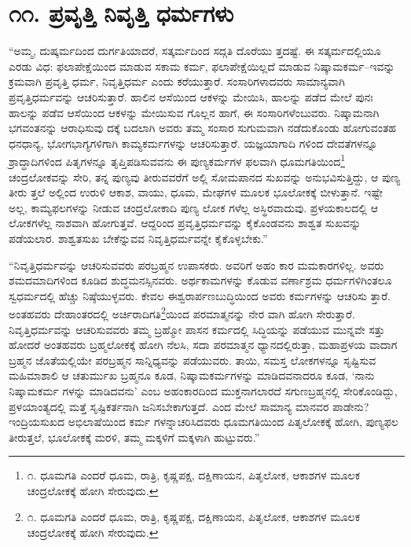 
\chapter{೧೧. ಪ್ರವೃತ್ತಿ ನಿವೃತ್ತಿ ಧರ್ಮಗಳು}

“ಅಮ್ಮ, ದುಷ್ಕರ್ಮದಿಂದ ದುರ್ಗತಿಯಾದರೆ, ಸತ್ಕರ್ಮದಿಂದ ಸದ್ಗತಿ ದೊರೆಯು ತ್ತದಷ್ಟೆ. ಈ ಸತ್ಕರ್ಮದಲ್ಲಿಯೂ ಎರಡು ವಿಧ: ಫಲಾಪೇಕ್ಷೆಯಿಂದ ಮಾಡುವ ಸಕಾಮ ಕರ್ಮ, ಫಲಾಪೇಕ್ಷೆಯಿಲ್ಲದೆ ಮಾಡುವ ನಿಷ್ಕಾಮಕರ್ಮ–ಇವನ್ನು ಕ್ರಮವಾಗಿ ಪ್ರವೃತ್ತಿ ಧರ್ಮ, ನಿವೃತ್ತಿಧರ್ಮ ಎಂದು ಕರೆಯುತ್ತಾರೆ. ಸಂಸಾರಿಗಳಾದವರು ಸಾಮಾನ್ಯವಾಗಿ ಪ್ರವೃತ್ತಿಧರ್ಮವನ್ನು ಆಚರಿಸುತ್ತಾರೆ. ಹಾಲಿನ ಆಸೆಯಿಂದ ಆಕಳನ್ನು ಮೇಯಿಸಿ, ಹಾಲನ್ನು ಪಡೆದ ಮೇಲೆ ಪುನಃ ಹಾಲನ್ನು ಪಡೆವ ಆಸೆಯಿಂದ ಆಕಳನ್ನು ಮೇಯಿಸುವ ಗೊಲ್ಲನ ಹಾಗೆ, ಈ ಸಂಸಾರಿಗಳೆಂಬುವರು. ನಿಷ್ಕಾಮನಾಗಿ ಭಗವಂತನನ್ನು ಆರಾಧಿಸುವು ದಕ್ಕೆ ಬದಲಾಗಿ ಅವರು ತಮ್ಮ ಸಂಸಾರ ಸುಗುಮವಾಗಿ ನಡೆದುಕೊಂಡು ಹೋಗುವಂತಹ ಧನಧಾನ್ಯ, ಭೋಗಭಾಗ್ಯಗಳಿಗಾಗಿ ಕಾಮ್ಯಕರ್ಮಗಳನ್ನು ಆಚರಿಸುತ್ತಾರೆ. ಯಜ್ಞಯಾಗಾದಿ ಗಳಿಂದ ದೇವತೆಗಳನ್ನೂ ಶ್ರಾದ್ಧಾದಿಗಳಿಂದ ಪಿತೃಗಳನ್ನೂ ತೃಪ್ತಿಪಡಿಸುವವನು ಈ ಪುಣ್ಯಕರ್ಮಗಳ ಫಲವಾಗಿ ಧೂಮಗತಿಯಿಂದ\footnote{೧. ಧೂಮಗತಿ ಎಂದರೆ ಧೂಮ, ರಾತ್ರಿ, ಕೃಷ್ಣಪಕ್ಷ, ದಕ್ಷಿಣಾಯನ, ಪಿತೃಲೋಕ, ಆಕಾಶಗಳ ಮೂಲಕ ಚಂದ್ರಲೋಕಕ್ಕೆ ಹೋಗಿ ಸೇರುವುದು.} ಚಂದ್ರಲೋಕವನ್ನು ಸೇರಿ, ತನ್ನ ಪುಣ್ಯವು ತೀರುವವರೆಗೆ ಅಲ್ಲಿ ಸೋಮಪಾನದ ಸುಖವನ್ನು ಅನುಭವಿಸುತ್ತಿದ್ದು, ಆ ಪುಣ್ಯ ತೀರು ತ್ತಲೆ ಅಲ್ಲಿಂದ ಉರುಳಿ ಆಕಾಶ, ವಾಯು, ಧೂಮ, ಮೇಘಗಳ ಮೂಲಕ ಭೂಲೋಕಕ್ಕೆ ಬೀಳುತ್ತಾನೆ. ಇಷ್ಟೇ ಅಲ್ಲ, ಕಾಮ್ಯಫಲಗಳನ್ನು ನೀಡುವ ಚಂದ್ರಲೋಕಾದಿ ಪುಣ್ಯ ಲೋಕ ಗಳೆಲ್ಲ ಅಸ್ಥಿರವಾದುವು. ಪ್ರಳಯಕಾಲದಲ್ಲಿ ಆ ಲೋಕಗಳೆಲ್ಲ ನಾಶವಾಗಿ ಹೋಗುತ್ತವೆ. ಆದ್ದರಿಂದ ಪ್ರವೃತ್ತಿಧರ್ಮವನ್ನು ಕೈಕೊಂಡವನು ಶಾಶ್ವತ ಸುಖವನ್ನು ಪಡೆಯಲಾರ. ಶಾಶ್ವತಸುಖ ಬೇಕೆನ್ನುವವ ನಿವೃತ್ತಿಧರ್ಮವನ್ನೇ ಕೈಕೊಳ್ಳಬೇಕು.”

“ನಿವೃತ್ತಿಧರ್ಮವನ್ನು ಆಚರಿಸುವವರು ಪರಬ್ರಹ್ಮನ ಉಪಾಸಕರು. ಅವರಿಗೆ ಅಹಂ ಕಾರ ಮಮಕಾರಗಳಿಲ್ಲ. ಅವರು ಶಮದಮಾದಿಗಳಿಂದ ಕೂಡಿದ ಶುದ್ಧಮನಸ್ಸಿನವರು. ಅರ್ಥಕಾಮಗಳನ್ನು ಕೊಡುವ ವರ್ಣಾಶ್ರಮ ಧರ್ಮಗಳಿಗಿಂತಲೂ ಸ್ವಧರ್ಮದಲ್ಲಿ ಹೆಚ್ಚು ನಿಷ್ಠೆಯುಳ್ಳವರು. ಕೇವಲ ಈಶ್ವರಾರ್ಪಣಬುದ್ಧಿಯಿಂದ ಅವರು ಕರ್ಮಗಳನ್ನು ಆಚರಿಸು ತ್ತಾರೆ. ಅಂತಹವರು ದೇಹಾಂತರದಲ್ಲಿ ಅರ್ಚಿರಾದಿಗತಿ\footnote{೧. ಧೂಮಗತಿ ಎಂದರೆ ಧೂಮ, ರಾತ್ರಿ, ಕೃಷ್ಣಪಕ್ಷ, ದಕ್ಷಿಣಾಯನ, ಪಿತೃಲೋಕ, ಆಕಾಶಗಳ ಮೂಲಕ ಚಂದ್ರಲೋಕಕ್ಕೆ ಹೋಗಿ ಸೇರುವುದು.}ಯಿಂದ ಪರಮಾತ್ಮನನ್ನು ನೇರ ವಾಗಿ ಹೋಗಿ ಸೇರುತ್ತಾರೆ. ನಿವೃತ್ತಿಧರ್ಮವನ್ನು ಆಚರಿಸುವವರು ತಮ್ಮ ಬ್ರಹ್ಮೋ ಪಾಸನ ಕರ್ಮದಲ್ಲಿ ಸಿದ್ಧಿಯನ್ನು ಪಡೆಯುವ ಮುನ್ನವೇ ಸತ್ತು ಹೋದರೆ ಅಂತಹವರು ಬ್ರಹ್ಮಲೋಕಕ್ಕೆ ಹೋಗಿ ನೆಲಸಿ, ಸದಾ ಪರಮಾತ್ಮನ ಧ್ಯಾನದಲ್ಲಿರುತ್ತಾ, ಮಹಾಪ್ರಳಯ ವಾದಾಗ ಬ್ರಹ್ಮನ ಜೊತೆಯಲ್ಲಿಯೇ ಪರಬ್ರಹ್ಮನ ಸಾನ್ನಿಧ್ಯವನ್ನು ಪಡೆಯುವರು. ತಾಯಿ, ಸಮಸ್ತ ಲೋಕಗಳನ್ನೂ ಸೃಷ್ಟಿಸುವ ಮಹಿಮಾಶಾಲಿ ಆ ಚತುರ್ಮುಖ ಬ್ರಹ್ಮನೂ ಕೂಡ, ನಿಷ್ಕಾಮಕರ್ಮಗಳನ್ನು ಮಾಡಿದವನಾದರೂ ಕೂಡ, ‘ನಾನು ನಿಷ್ಕಾಮಕರ್ಮ ಗಳನ್ನು ಮಾಡಿದವನು’ ಎಂಬ ಅಹಂಕಾರದಿಂದ ಮುಕ್ತನಾಗಲಾರದೆ ಸಗುಣಬ್ರಹ್ಮನಲ್ಲಿ ಸೇರಿಕೊಂಡಿದ್ದು, ಪ್ರಳಯಾಂತ್ಯದಲ್ಲಿ ಮತ್ತೆ ಸೃಷ್ಟಿಕರ್ತನಾಗಿ ಜನಿಸಬೇಕಾಗುತ್ತದೆ. ಎಂದ ಮೇಲೆ ಸಾಮಾನ್ಯ ಮಾನವರ ಪಾಡೇನು? ಇಂದ್ರಿಯಸುಖದ ಅಭಿಲಾಷೆಯಿಂದ ಕರ್ಮ ಗಳನ್ನಾಚರಿಸಿದವರು ಧೂಮಗತಿಯಿಂದ ಪಿತೃಲೋಕಕ್ಕೆ ಹೋಗಿ, ಪುಣ್ಯಫಲ ತೀರುತ್ತಲೆ, ಭೂಲೋಕಕ್ಕೆ ಮರಳಿ, ತಮ್ಮ ಮಕ್ಕಳಿಗೆ ಮಕ್ಕಳಾಗಿ ಹುಟ್ಟುವರು.”

